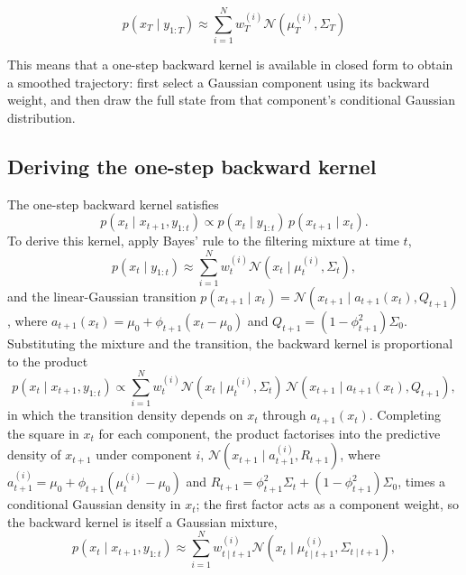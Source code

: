 \begin{equation}
    p(x_{T} \mid y_{1:T}) \approx \sum_{i=1}^N w_{T}^{(i)} \mathcal{N}(\mu_T^{(i)}, \Sigma_T)
\end{equation}

This means that a one-step backward kernel is available in closed form to obtain a smoothed trajectory: first select a Gaussian component using its backward weight, and then draw the full state from that component's conditional Gaussian distribution.

\subsection{Deriving the one-step backward kernel}

The one-step backward kernel satisfies
\begin{equation}
p(x_t \mid x_{t+1}, y_{1:t}) \propto p(x_t \mid y_{1:t})\, p(x_{t+1} \mid x_t).
\end{equation}
To derive this kernel, apply Bayes' rule to the filtering mixture at time $t$,
\begin{equation}
p(x_t \mid y_{1:t}) \approx \sum_{i=1}^N w_t^{(i)} \mathcal{N}(x_t \mid \mu_t^{(i)}, \Sigma_t),
\end{equation}
and the linear-Gaussian transition $p(x_{t+1} \mid x_t) = \mathcal{N}(x_{t+1} \mid a_{t+1}(x_t), Q_{t+1})$, where $a_{t+1}(x_t) = \mu_0 + \phi_{t+1}(x_t - \mu_0)$ and $Q_{t+1} = (1 - \phi_{t+1}^2)\Sigma_0$. Substituting the mixture and the transition, the backward kernel is proportional to the product
\begin{equation*}
p(x_t \mid x_{t+1}, y_{1:t}) \propto \sum_{i=1}^N w_t^{(i)} \mathcal{N}(x_t \mid \mu_t^{(i)}, \Sigma_t)\, \mathcal{N}(x_{t+1} \mid a_{t+1}(x_t), Q_{t+1}),
\end{equation*}
in which the transition density depends on $x_t$ through $a_{t+1}(x_t)$. Completing the square in $x_t$ for each component, the product factorises into the predictive density of $x_{t+1}$ under component $i$, $\mathcal{N}(x_{t+1} \mid a_{t+1}^{(i)}, R_{t+1})$, where $a_{t+1}^{(i)} = \mu_0 + \phi_{t+1}(\mu_t^{(i)} - \mu_0)$ and $R_{t+1} = \phi_{t+1}^2 \Sigma_t + (1 - \phi_{t+1}^2)\Sigma_0$, times a conditional Gaussian density in $x_t$; the first factor acts as a component weight, so the backward kernel is itself a Gaussian mixture,
\begin{equation}
p(x_t \mid x_{t+1}, y_{1:t}) \approx \sum_{i=1}^N w_{t \mid t+1}^{(i)} \mathcal{N}(x_t \mid \mu_{t \mid t+1}^{(i)}, \Sigma_{t \mid t+1}),
\end{equation}

